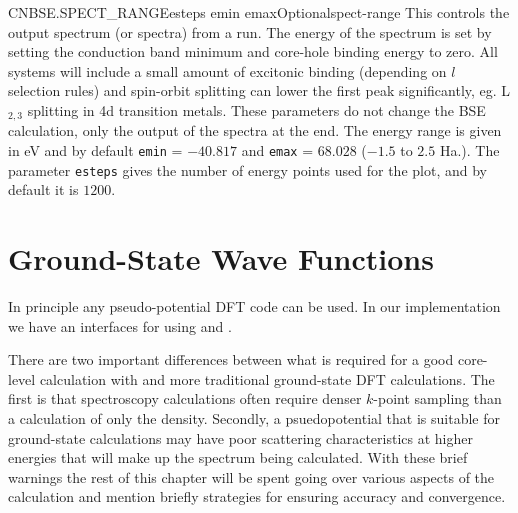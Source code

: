 \documentclass[11pt]{report}
\begin{document}
\begin{Card}{CNBSE.SPECT\_RANGE}{esteps emin emax}{Optional}{spect-range}
This controls the output spectrum (or spectra) from a run. The energy of the spectrum is set by setting the conduction band minimum and core-hole binding energy to zero. All systems will include a small amount of excitonic binding (depending on $l$ selection rules) and spin-orbit splitting can lower the first peak significantly, eg. L$_{2,3}$ splitting in 4d transition metals. These parameters do not change the BSE calculation, only the output of the spectra at the end. The energy range is given in eV and by default \texttt{emin} = $-40.817$ and \texttt{emax} = $68.028$ ($-1.5$ to $2.5$ Ha.). The parameter \texttt{esteps} gives the number of energy points used for the plot, and by default it is $1200$.
\end{Card}








%

\chapter{Ground-State Wave Functions}
\label{ground_state}
In principle any pseudo-potential DFT code can be used. In our implementation we have an interfaces for using 
 \cite{abinit0,abinit1,abinit2,abinit3} and  \cite{espresso1,espresso2}. 

There are two important differences between what is required for a good core-level calculation with  and more traditional ground-state DFT calculations. The first is that spectroscopy calculations often require denser $k$-point sampling than a calculation of only the density. Secondly, a psuedopotential that is suitable for ground-state calculations may have poor scattering characteristics at higher energies that will make up the spectrum being calculated. With these brief warnings the rest of this chapter will be spent going over various aspects of the calculation and mention briefly strategies for ensuring accuracy and convergence.
\end{document}
